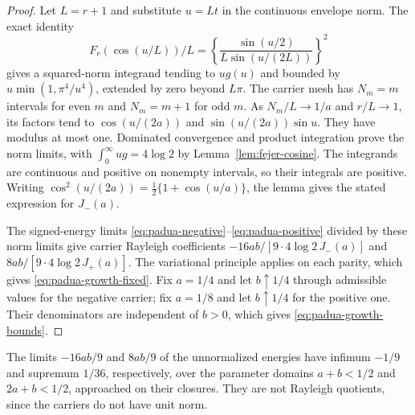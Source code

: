 \documentclass[preprint,12pt,a4paper]{elsarticle}
\theoremstyle{remark}
\begin{document}
\begin{proof}
Let $L=r+1$ and substitute $u=Lt$ in the continuous envelope norm.
The exact identity
\[
 F_r(\cos(u/L))/L=
 \left\{\frac{\sin(u/2)}{L\sin(u/(2L))}\right\}^2
\]
gives a squared-norm integrand tending to $u g(u)$ and bounded by
$u\min(1,\allowbreak\pi^4/u^4)$, extended by zero beyond $L\pi$.
The carrier mesh has $N_m=m$ intervals for even $m$ and $N_m=m+1$
for odd $m$. As $N_m/L\to1/a$ and $r/L\to1$, its factors tend to
$\cos(u/(2a))$ and $\sin(u/(2a))\sin u$. They have modulus at most
one. Dominated convergence and product integration prove the norm
limits, with $\int_0^\infty ug=4\log2$ by Lemma~\ref{lem:fejer-cosine}.
The integrands are continuous and positive on nonempty
intervals, so their integrals are positive. Writing
$\cos^2(u/(2a))=\frac12\{1+\cos(u/a)\}$, the lemma gives the stated
expression for $J_-(a)$.

The signed-energy limits \eqref{eq:padua-negative}--\eqref{eq:padua-positive}
divided by these norm limits give carrier
Rayleigh coefficients $-16ab/[9\cdot4\log2\,J_-(a)]$ and
$8ab/[9\cdot4\log2\,J_+(a)]$.
The variational principle applies on each parity, which gives
\eqref{eq:padua-growth-fixed}. Fix $a=1/4$ and
let $b\uparrow1/4$ through admissible values for the negative
carrier; fix $a=1/8$ and let $b\uparrow1/4$ for the positive one.
Their denominators are independent of $b>0$, which gives
\eqref{eq:padua-growth-bounds}.
\end{proof}

The limits $-16ab/9$ and $8ab/9$ of the unnormalized energies have infimum $-1/9$
and supremum $1/36$, respectively, over the parameter domains $a+b<1/2$ and $2a+b<1/2$, approached on
their closures. They are not Rayleigh quotients, since the carriers do not have
unit norm.
\end{document}
